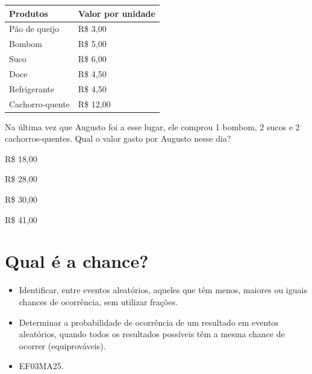 \begin{longtable}[]{@{}ll@{}}
\toprule
Produtos & Valor por unidade\tabularnewline
\midrule
\endhead
Pão de queijo & R\$ 3,00\tabularnewline
Bombom & R\$ 5,00\tabularnewline
Suco & R\$ 6,00\tabularnewline
Doce & R\$ 4,50\tabularnewline
Refrigerante & R\$ 4,50\tabularnewline
Cachorro-quente & R\$ 12,00\tabularnewline
\bottomrule
\end{longtable}

Na última vez que Augusto foi a esse lugar, ele comprou 1 bombom, 2
sucos e 2 cachorros-quentes. Qual o valor gasto por Augusto nesse dia?

\begin{escolha}

\item
  R\$ 18,00
\item
  R\$ 28,00
\item
  R\$ 30,00
\item
  R\$ 41,00
\end{escolha}

\chapter{Qual é a chance?}


\begin{itemize}
\item Identificar, entre eventos aleatórios, aqueles que têm menos, maiores ou
iguais chances de ocorrência, sem utilizar frações.

\item Determinar a probabilidade de ocorrência de um resultado em eventos
aleatórios, quando todos os resultados possíveis têm a mesma chance de
ocorrer (equiprováveis).
\end{itemize}


\begin{itemize}
  \item 
 EF03MA25.
\end{itemize}


